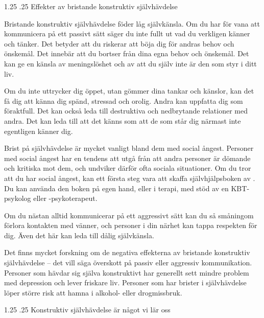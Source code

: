 \documentclass[swedish,a4paper]{book}
\makeatletter
\renewcommand\section{\@startsection{section}{1}{\z@}%
                                   {1.25\baselineskip}%
                                   {.25\baselineskip}%
                                   {\fontsize{1.25\baselineskip}{1.25\baselineskip}\selectfont\sffamily\bfseries}} %
\makeatother
\begin{document}
\section{Effekter av bristande konstruktiv
självhävdelse}\label{effekter-av-bristande-sjuxe4lvhuxe4vdelse}

Bristande konstruktiv självhävdelse föder låg självkänsla. Om
du har för vana att kommunicera på ett passivt sätt säger du inte fullt
ut vad du verkligen känner och tänker. Det betyder att du riskerar att
böja dig för andras behov och önskemål. Det innebär att du bortser från dina egna behov och önskemål. Det kan ge en känsla av meningslöshet och av att du själv inte är den som styr i ditt liv.

Om du inte uttrycker dig öppet, utan gömmer dina tankar och känslor,
kan det få dig att känna dig spänd, stressad och orolig. Andra kan uppfatta dig som föraktfull.
Det kan också leda till destruktiva och nedbrytande relationer med
andra. Det kan leda till att det känns som att de som står dig närmast
inte egentligen känner dig.

Brist på självhävdelse är mycket vanligt bland dem med social ångest.
Personer med social ångest har en tendens att utgå från att andra personer är
dömande och kritiska mot dem, och undviker därför ofta sociala
situationer. Om du tror att du har social ångest, kan ett första steg vara att skaffa självhjälpsboken  av \textcite{furmark2006social}. Du kan använda den boken på egen hand, eller i terapi, med stöd av en KBT-psykolog eller -psykoterapeut.

Om du nästan alltid kommunicerar på ett aggressivt sätt kan du så
småningom förlora kontakten med vänner, och personer i din närhet kan tappa respekten för dig. Även det här kan leda till dålig självkänsla.

Det finns mycket forskning om de negativa effekterna av bristande
konstruktiv självhävdelse -- det vill säga överskott på passiv eller
aggressiv kommunikation. Personer som hävdar sig själva konstruktivt har
generellt sett mindre problem med depression och lever friskare liv.
Personer som har brister i självhävdelse löper större risk att hamna i
alkohol- eller drogmissbruk.

\section{Konstruktiv självhävdelse är något vi lär oss}
\end{document}
